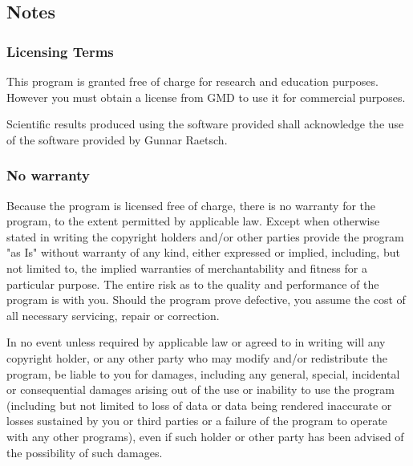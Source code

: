 \documentclass{article}
\begin{document}
\begin{appendix}
\subsection{Notes}
\label{app:terms}
\subsubsection{Licensing Terms}

This program is granted free of charge for research and education purposes.
However you must obtain a license from GMD to use it for commercial purposes.

Scientific results produced using the software provided shall acknowledge the
use of the software provided by Gunnar Raetsch.

\subsubsection{No warranty}

Because the program is licensed free of charge, there is no warranty for the
program, to the extent permitted by applicable law. Except when otherwise
stated in writing the copyright holders and/or other parties provide the
program "as Is" without warranty of any kind, either expressed or implied,
including, but not limited to, the implied warranties of merchantability and
fitness for a particular purpose. The entire risk as to the quality and
performance of the program is with you. Should the program prove defective,
you assume the cost of all necessary servicing, repair or correction.

In no event unless required by applicable law or agreed to in writing will any
copyright holder, or any other party who may modify and/or redistribute the
program, be liable to you for damages, including any general, special,
incidental or consequential damages arising out of the use or inability to use
the program (including but not limited to loss of data or data being rendered
inaccurate or losses sustained by you or third parties or a failure of the
program to operate with any other programs), even if such holder or other
party has been advised of the possibility of such damages.

\end{appendix}

 

\end{document}
